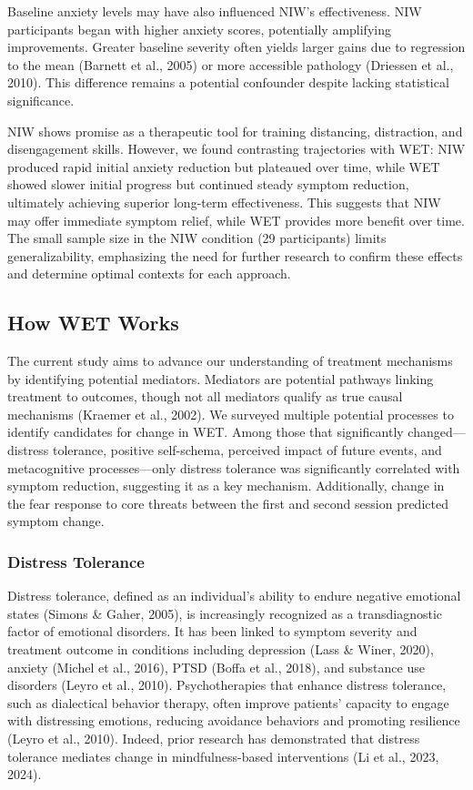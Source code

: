 \documentclass[
  man,floatsintext]{apa7}
\begin{document}
Baseline anxiety levels may have also influenced NIW's effectiveness.
NIW participants began with higher anxiety scores, potentially amplifying improvements.
Greater baseline severity often yields larger gains due to regression to the mean (Barnett et al., 2005) or more accessible pathology (Driessen et al., 2010).
This difference remains a potential confounder despite lacking statistical significance.

NIW shows promise as a therapeutic tool for training distancing, distraction, and disengagement skills.
However, we found contrasting trajectories with WET: NIW produced rapid initial anxiety reduction but plateaued over time, while WET showed slower initial progress but continued steady symptom reduction, ultimately achieving superior long-term effectiveness.
This suggests that NIW may offer immediate symptom relief, while WET provides more benefit over time.
The small sample size in the NIW condition (29 participants) limits generalizability, emphasizing the need for further research to confirm these effects and determine optimal contexts for each approach.

\subsection{How WET Works}\label{how-wet-works}

The current study aims to advance our understanding of treatment mechanisms by identifying potential mediators.
Mediators are potential pathways linking treatment to outcomes, though not all mediators qualify as true causal mechanisms (Kraemer et al., 2002).
We surveyed multiple potential processes to identify candidates for change in WET.
Among those that significantly changed---distress tolerance, positive self-schema, perceived impact of future events, and metacognitive processes---only distress tolerance was significantly correlated with symptom reduction, suggesting it as a key mechanism.
Additionally, change in the fear response to core threats between the first and second session predicted symptom change.

\subsubsection{Distress Tolerance}\label{distress-tolerance}

Distress tolerance, defined as an individual's ability to endure negative emotional states (Simons \& Gaher, 2005), is increasingly recognized as a transdiagnostic factor of emotional disorders.
It has been linked to symptom severity and treatment outcome in conditions including depression (Lass \& Winer, 2020), anxiety (Michel et al., 2016), PTSD (Boffa et al., 2018), and substance use disorders (Leyro et al., 2010).
Psychotherapies that enhance distress tolerance, such as dialectical behavior therapy, often improve patients' capacity to engage with distressing emotions, reducing avoidance behaviors and promoting resilience (Leyro et al., 2010).
Indeed, prior research has demonstrated that distress tolerance mediates change in mindfulness-based interventions (Li et al., 2023, 2024).
\end{document}

